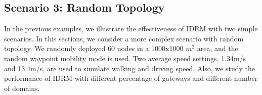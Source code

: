 \subsection{Scenario 3: Random Topology}
\label{sec:case3}
In the previous examples, we illustrate the effectiveness of IDRM
with two simple scenarios. 
In this sections, we consider a more complex scenario with 
random topology. 
We randomly deployed 60 nodes in a 1000x1000 $m^{2}$ area,
and the random waypoint mobility mode is used.
Two average speed settings, 1.34m/s and 13.4m/s, 
are used to simulate walking and driving speed.
Also, we study the performance of IDRM with different percentage of
gateways and different number of domains.
